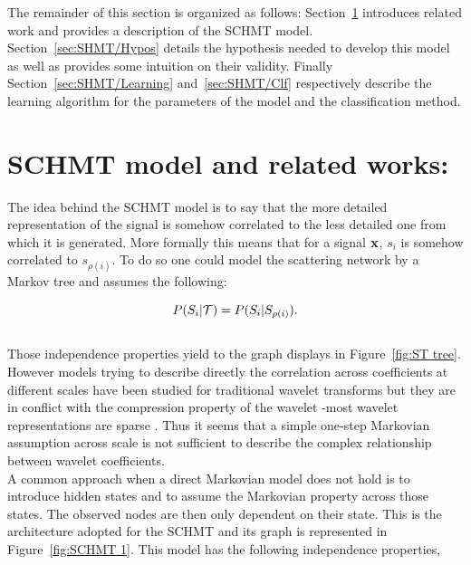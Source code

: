 \documentclass[a4paper,11pt]{report}
\begin{document}
  The remainder of this section is organized as follows: Section~\ref{sec:SHMT/Rel work} introduces related work and provides a description of the SCHMT model. Section~\ref{sec:SHMT/Hypos} details the hypothesis needed to develop this model as well as provides some intuition on their validity. Finally Section~\ref{sec:SHMT/Learning} and~\ref{sec:SHMT/Clf} respectively describe the learning algorithm for the parameters of the model and the classification method.

  
  \section{SCHMT model and related works:}
    \label{sec:SHMT/Rel work}
      
    The idea behind the SCHMT model is to say that the more detailed representation of the signal is somehow correlated to the less detailed one from which it is generated. More formally this means that for a signal ${\bf x}$, $s_{i}$ is somehow correlated to $s_{\rho(i)}$. To do so one could model the scattering network by a Markov tree and assumes the following:
    
    \begin{equation}
      P(S_{i} |\mathcal{T}) = P(S_{i} | S_{\rho(i)}).
      \label{eq:SMT - false hypo}
    \end{equation}\\

    Those independence properties yield to the graph displays in Figure~\ref{fig:ST tree}. However models trying to describe directly the correlation across coefficients at different scales have been studied for traditional wavelet transforms \cite{lee1996new} but they are in conflict with the compression property of the wavelet -\ie most wavelet representations are sparse \cite{crouse1998wavelet}. Thus it seems that a simple one-step Markovian assumption across scale is not sufficient to describe the complex relationship between wavelet coefficients.\\
    
    A common approach when a direct Markovian model does not hold is to introduce hidden states and to assume the Markovian property across those states. The observed nodes are then only dependent on their state. This is the architecture adopted for the SCHMT and its graph is represented in Figure~\ref{fig:SCHMT 1}. This model has the following independence properties,
    
\end{document}
